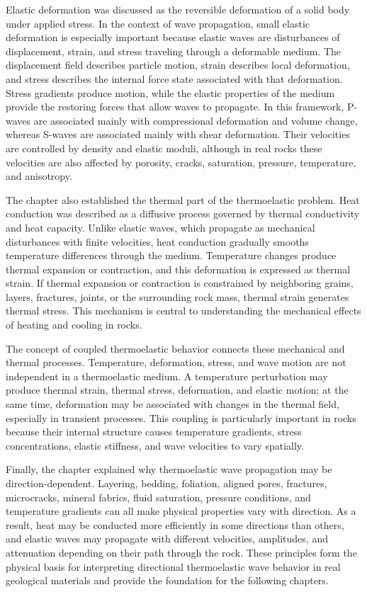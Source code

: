 Elastic deformation was discussed as the reversible deformation of a solid body under applied stress. In the context of wave propagation, small elastic deformation is especially important because elastic waves are disturbances of displacement, strain, and stress traveling through a deformable medium. The displacement field describes particle motion, strain describes local deformation, and stress describes the internal force state associated with that deformation. Stress gradients produce motion, while the elastic properties of the medium provide the restoring forces that allow waves to propagate. In this framework, P-waves are associated mainly with compressional deformation and volume change, whereas S-waves are associated mainly with shear deformation. Their velocities are controlled by density and elastic moduli, although in real rocks these velocities are also affected by porosity, cracks, saturation, pressure, temperature, and anisotropy.

The chapter also established the thermal part of the thermoelastic problem. Heat conduction was described as a diffusive process governed by thermal conductivity and heat capacity. Unlike elastic waves, which propagate as mechanical disturbances with finite velocities, heat conduction gradually smooths temperature differences through the medium. Temperature changes produce thermal expansion or contraction, and this deformation is expressed as thermal strain. If thermal expansion or contraction is constrained by neighboring grains, layers, fractures, joints, or the surrounding rock mass, thermal strain generates thermal stress. This mechanism is central to understanding the mechanical effects of heating and cooling in rocks.

The concept of coupled thermoelastic behavior connects these mechanical and thermal processes. Temperature, deformation, stress, and wave motion are not independent in a thermoelastic medium. A temperature perturbation may produce thermal strain, thermal stress, deformation, and elastic motion; at the same time, deformation may be associated with changes in the thermal field, especially in transient processes. This coupling is particularly important in rocks because their internal structure causes temperature gradients, stress concentrations, elastic stiffness, and wave velocities to vary spatially.

Finally, the chapter explained why thermoelastic wave propagation may be direction-dependent. Layering, bedding, foliation, aligned pores, fractures, microcracks, mineral fabrics, fluid saturation, pressure conditions, and temperature gradients can all make physical properties vary with direction. As a result, heat may be conducted more efficiently in some directions than others, and elastic waves may propagate with different velocities, amplitudes, and attenuation depending on their path through the rock. These principles form the physical basis for interpreting directional thermoelastic wave behavior in real geological materials and provide the foundation for the following chapters.
